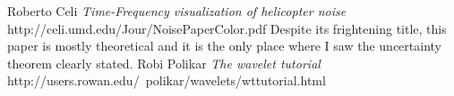 \documentclass[12pt]{article}
\begin{document}
\begin{thebibliography}{1}
 Roberto Celi {\it Time-Frequency visualization of helicopter noise}\newline 
http://celi.umd.edu/Jour/NoisePaperColor.pdf\newline
Despite its frightening title, this paper is mostly theoretical and it is the only place where I saw the uncertainty theorem clearly stated.
 Robi Polikar {\it The wavelet tutorial}\newline
http://users.rowan.edu/~polikar/wavelets/wttutorial.html
\end{thebibliography}

\end{document}
